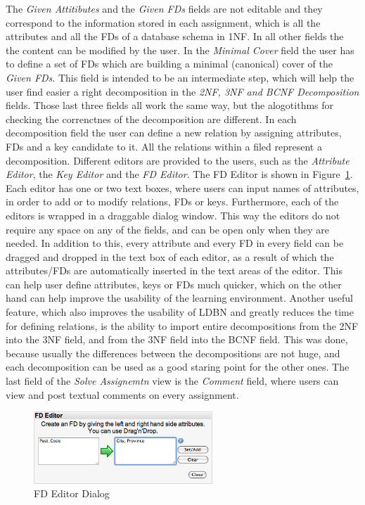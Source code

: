The \textit{Given Attitibutes} and the \textit{Given FDs} fields are not editable
and they correspond	to the information stored in each assignment, which is all the 
attributes and all the FDs of a database schema in 1NF. In all other fields 
the the content can be modified by the user.
In the \textit{Minimal Cover} field the user has to define a set of FDs
which are building a minimal (canonical) cover of the \textit{Given FDs}. 
This field is intended to be an intermediate step, which will help the user find easier a right decomposition
in the \textit{2NF, 3NF and BCNF Decomposition} fields. Those last three fields all
work the same way, but the alogotithms for checking the correnctnes of the 
decomposition are different.  
In each decomposition field the user can define a new
relation by assigning attributes, FDs and a key candidate to it. All the relations
within a filed represent a decomposition. Different editors are provided to the users,
such as
the \textit{Attribute Editor}, the \textit{Key Editor} and the \textit{FD Editor}.
The FD Editor is shown in Figure~\ref{fig:fdedit}. Each editor has one or two
text boxes, where users can input names of attributes, in order to 
add or to modify relations, FDs or keys. Furthermore,
each of the editors is wrapped in a draggable dialog window. 
This way the editors do not require any space on any of the fields, 
and can be open only when they are needed.
In addition to this, every attribute and every FD in every field can be dragged and
dropped in the text box of each editor, as a result of which the attributes/FDs
are automatically inserted in the text areas of the editor.
This can help user define attributes, keys or
FDs much quicker, which on the other hand can help improve the usability of 
the learning environment. 
Another useful feature, which also improves the usability of LDBN and greatly reduces
the time for defining relations, 
is the ability to 
import entire decompositions from the 2NF into the 3NF field, and from the 
3NF field into the BCNF field. This was done, because usually 
the differences between the decompositions are not huge, and each decomposition
can be used as a good staring point for the other ones.	
The last field of the \textit{Solve Assignemtn} view is the \textit{Comment} field, 
where users can view and post textual comments on every assignment.
\newline

\begin{figure}[h]
	\begin{center}
		\includegraphics[width=0.6\textwidth]{./img/screen04.png}
		\caption{FD Editor Dialog}
		\label{fig:fdedit}
	\end{center}
\end{figure}

